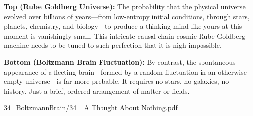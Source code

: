 \begin{SideNotePage}{
  \textbf{Top (Rube Goldberg Universe):}  
  The probability that the physical universe evolved over billions of years—from low-entropy initial conditions, through stars, planets, chemistry, and biology—to produce a thinking mind like yours at this moment is vanishingly small. This intricate causal chain cosmic Rube Goldberg machine needs to be tuned to such perfection that it is nigh impossible. \par

  \textbf{Bottom (Boltzmann Brain Fluctuation):}  
  By contrast, the spontaneous appearance of a fleeting brain—formed by a random fluctuation in an otherwise empty universe—is far more probable. It requires no stars, no galaxies, no history. Just a brief, ordered arrangement of matter or fields.\par
}{34_BoltzmannBrain/34_ A Thought About Nothing.pdf}
\end{SideNotePage}

